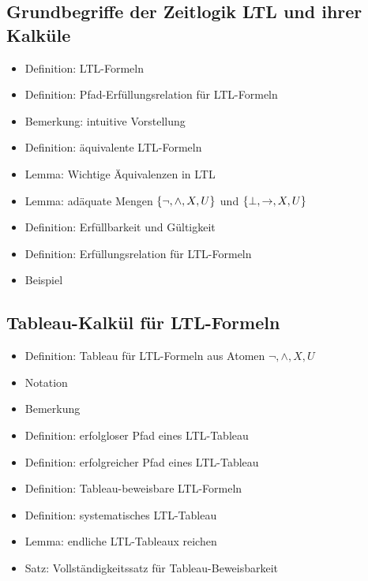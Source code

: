 \documentclass[8pt,fleqn,a4paper,twoside]{article}
\begin{document}
\begin{multicols}{2}
    \subsection{Grundbegriffe der Zeitlogik LTL und ihrer Kalküle} %
    \label{sub:grundbegriffe_der_zeitlogik_ltl_und_ihrer_kalküle}
      \begin{itemize}
        \item Definition: LTL-Formeln
        \item Definition: Pfad-Erfüllungsrelation für LTL-Formeln
        \item Bemerkung: intuitive Vorstellung
        \item Definition: äquivalente LTL-Formeln
        \item Lemma: Wichtige Äquivalenzen in LTL
        \item Lemma: adäquate Mengen $\set{\lnot,\land,X,U}{}$ und $\set{\perp,\to,X,U}{}$
        \item Definition: Erfüllbarkeit und Gültigkeit
        \item Definition: Erfüllungsrelation für LTL-Formeln
        \item Beispiel
      \end{itemize}

    \subsection{Tableau-Kalkül für LTL-Formeln} %
    \label{sub:tableau_kalkül_für_ltl_formeln}
      \begin{itemize}
        \item Definition: Tableau für LTL-Formeln aus Atomen $\lnot,\land,X,U$
        \item Notation
        \item Bemerkung
        \item Definition: erfolgloser Pfad eines LTL-Tableau
        \item Definition: erfolgreicher Pfad eines LTL-Tableau
        \item Definition: Tableau-beweisbare LTL-Formeln
        \item Definition: systematisches LTL-Tableau
        \item Lemma: endliche LTL-Tableaux reichen
        \item Satz: Vollständigkeitssatz für Tableau-Beweisbarkeit
      \end{itemize}


\end{multicols}
\end{document}
